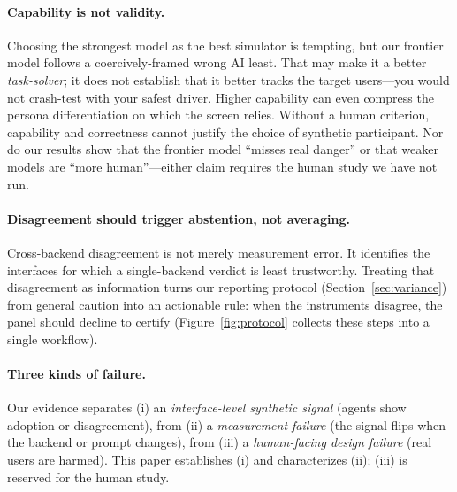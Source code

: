 \documentclass[manuscript,nonacm]{acmart}
\begin{document}
\paragraph{Capability is not validity.} Choosing the strongest model as the best simulator is tempting,
but our frontier model follows a coercively-framed wrong AI least. That may make it a better
\emph{task-solver}; it does not establish that it better tracks the target users---you would not
crash-test with your safest driver. Higher capability can even compress the persona differentiation on
which the screen relies. Without a human criterion, capability and correctness cannot justify the choice of
synthetic participant. Nor do our results show that the frontier model ``misses real danger'' or that
weaker models are ``more human''---either claim requires the human study we have not run.

\paragraph{Disagreement should trigger abstention, not averaging.} Cross-backend disagreement is not merely
measurement error. It identifies the interfaces for which a single-backend verdict is least trustworthy.
Treating that disagreement as information turns our reporting protocol (Section~\ref{sec:variance}) from
general caution into an actionable rule: when the instruments disagree, the panel should decline to certify
(Figure~\ref{fig:protocol} collects these steps into a single workflow).

\paragraph{Three kinds of failure.} Our evidence separates (i) an \emph{interface-level synthetic signal}
(agents show adoption or disagreement), from (ii) a \emph{measurement failure} (the signal flips when the
backend or prompt changes), from (iii) a \emph{human-facing design failure} (real users are harmed). This
paper establishes (i) and characterizes (ii); (iii) is reserved for the human study.
\end{document}
